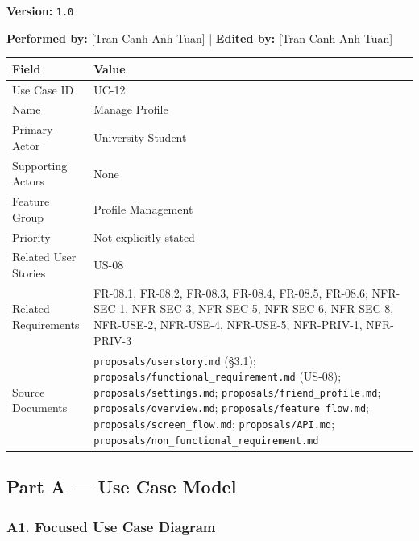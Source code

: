 \documentclass[12pt]{article}
\renewcommand{\baselinestretch}{1.5}
\begin{document}
\textbf{Version:} \texttt{1.0}
\par\medskip

\textbf{Performed by:} [Tran Canh Anh Tuan] | \textbf{Edited by:} [Tran Canh Anh Tuan]
\par\medskip

\begingroup
\small
\renewcommand{\baselinestretch}{1.0}\selectfont
\renewcommand{\arraystretch}{1.15}
\setlength{\tabcolsep}{6pt}
\begin{longtable}{|>{\raggedright\arraybackslash}p{}|>{\raggedright\arraybackslash}p{}|}
\hline
\textbf{Field} & \textbf{Value} \\ \hline
\endhead
Use Case ID & UC-12 \\ \hline
Name & Manage Profile \\ \hline
Primary Actor & University Student \\ \hline
Supporting Actors & None \\ \hline
Feature Group & Profile Management \\ \hline
Priority & Not explicitly stated \\ \hline
Related User Stories & US-08 \\ \hline
Related Requirements & FR-08.1, FR-08.2, FR-08.3, FR-08.4, FR-08.5, FR-08.6; NFR-SEC-1, NFR-SEC-3, NFR-SEC-5, NFR-SEC-6, NFR-SEC-8, NFR-USE-2, NFR-USE-4, NFR-USE-5, NFR-PRIV-1, NFR-PRIV-3 \\ \hline
Source Documents & \texttt{proposals/userstory.md} (§3.1); \texttt{proposals/functional\_requirement.md} (US-08); \texttt{proposals/settings.md}; \texttt{proposals/friend\_profile.md}; \texttt{proposals/overview.md}; \texttt{proposals/feature\_flow.md}; \texttt{proposals/screen\_flow.md}; \texttt{proposals/API.md}; \texttt{proposals/non\_functional\_requirement.md} \\ \hline
\end{longtable}
\endgroup
\par\medskip

\hypertarget{sec:part-a-use-case-model}{}
\subsection*{Part A --- Use Case Model}
\par\medskip

\hypertarget{sec:a1-focused-use-case-diagram}{}
\subsubsection*{A1. Focused Use Case Diagram}
\par\medskip
\end{document}
